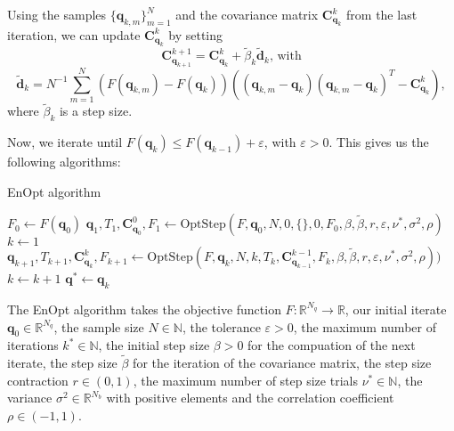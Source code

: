 Using the samples $\{\mathbf{q}_{k,m}\}_{m=1}^N$ and the covariance matrix $\mathbf{C}_{\mathbf{q}_k}^k$ from the last iteration, we can update $\mathbf{C}_{\mathbf{q}_k}^k$ by setting
\begin{displaymath}
\mathbf{C}_{\mathbf{q}_{k+1}}^{k+1}=\mathbf{C}_{\mathbf{q}_k}^k+\tilde{\beta}_k\tilde{\mathbf{d}}_k\text{, with}
\end{displaymath}
\begin{displaymath}
\tilde{\mathbf{d}}_k=N^{-1}\sum_{m=1}^N(F(\mathbf{q}_{k,m})-F(\mathbf{q}_k))((\mathbf{q}_{k,m}-\mathbf{q}_k)(\mathbf{q}_{k,m}-\mathbf{q}_k)^T-\mathbf{C}_{\mathbf{q}_k}^k),
\end{displaymath}
where $\tilde{\beta}_k$ is a step size.

Now, we iterate until $F(\mathbf{q}_k)\leq F(\mathbf{q}_{k-1})+\varepsilon$, with $\varepsilon>0$. This gives us the following algorithms:
\begin{algorithm}[H]%
\caption{EnOpt algorithm}
\begin{algorithmic}[1]
\State $F_{{0}}\gets F(\mathbf{q}_0)$
\State $\mathbf{q}_{1},T_{1},\mathbf{C}_{\mathbf{q}_{0}}^{0},F_{1}\gets\mathrm{OptStep}(F,\mathbf{q}_0,N,0,\{\},0,F_{0},\beta,\tilde{\beta},r,\varepsilon,\nu^*,\sigma^2,\rho)$
\State $k\gets 1$
\State $\mathbf{q}_{k+1},T_{k+1},\mathbf{C}_{\mathbf{q}_{k}}^{k},F_{k+1}\gets\mathrm{OptStep}(F,\mathbf{q}_k,N,k,T_k,\mathbf{C}_{\mathbf{q}_{k-1}}^{k-1},F_k,\beta,\tilde{\beta},r,\varepsilon,\nu^*,\sigma^2,\rho))$
\State $k\gets k+1$
\EndWhile
\State \Return $\mathbf{q}^*\gets\mathbf{q}_k$
\EndProcedure
\end{algorithmic}
\end{algorithm}
The EnOpt algorithm takes the objective function $F:\mathbb{R}^{N_q}\to\mathbb{R}$, our initial iterate $\mathbf{q}_0\in\mathbb{R}^{N_q}$, the sample size $N\in\mathbb{N}$, the tolerance $\varepsilon>0$, the maximum number of iterations $k^*\in\mathbb{N}$, the initial step size $\beta>0$ for the compuation of the next iterate, the step size $\tilde{\beta}$ for the iteration of the covariance matrix, the step size contraction $r\in(0,1)$, the maximum number of step size trials $\nu^*\in\mathbb{N}$, the variance $\sigma^2\in\mathbb{R}^{N_b}$ with positive elements and the correlation coefficient $\rho\in(-1,1)$.
